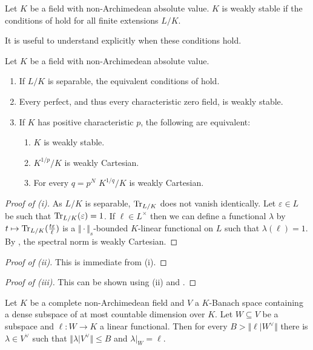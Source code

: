 \begin{definition}
    Let $K$ be a field with non-Archimedean absolute value. $K$ is weakly stable if the conditions of  hold for all finite extensions $L/K$. 
\end{definition}
It is useful to understand explicitly when these conditions hold. 
\begin{proposition}\label{prop: when things are weakly stable}
    Let $K$ be a field with non-Archimedean absolute value. 
    \begin{enumerate}[label=(\roman*)]
        \item If $L/K$ is separable, the equivalent conditions of  hold. 
        \item Every perfect, and thus every characteristic zero field, is weakly stable. 
        \item If $K$ has positive characteristic $p$, the following are equivalent: 
        \begin{enumerate}[label=(\alph*)]
            \item $K$ is weakly stable. 
            \item $K^{1/p}/K$ is weakly Cartesian. 
            \item For every $q=p^{N}$ $K^{1/q}/K$ is weakly Cartesian. 
        \end{enumerate}
    \end{enumerate}
\end{proposition}
\begin{proof}[Proof of (i)]
    As $L/K$ is separable, $\mathrm{Tr}_{L/K}$ does not vanish identically. Let $\varepsilon\in L$ be such that $\mathrm{Tr}_{L/K}(\varepsilon)=1$. If $\ell\in L^{\times}$ then we can define a functional $\lambda$ by $t\mapsto\mathrm{Tr}_{L/K}(\frac{t\varepsilon}{\ell})$ is a $\Vert\cdot\Vert_{s}$-bounded $K$-linear functional on $L$ such that $\lambda(\ell)=1$. By , the spectral norm is weakly Cartesian. 
\end{proof}
\begin{proof}[Proof of (ii)]
    This is immediate from (i). 
\end{proof}
\begin{proof}[Proof of (iii)]
    This can be shown using (ii) and . 
\end{proof}
\begin{proposition}\label{prop: restriction of bounded functionals}
    Let $K$ be a complete non-Archimedean field and $V$ a $K$-Banach space containing a dense subspace of at most countable dimension over $K$. Let $W\subseteq V$ be a subspace and $\ell:W\to K$ a linear functional. Then for every $B>\Vert \ell|W^{\vee}\Vert$ there is $\lambda\in V^{\vee}$ such that $\Vert\lambda|V^{\vee}\Vert\leq B$ and $\lambda|_{W}=\ell$. 
\end{proposition}
